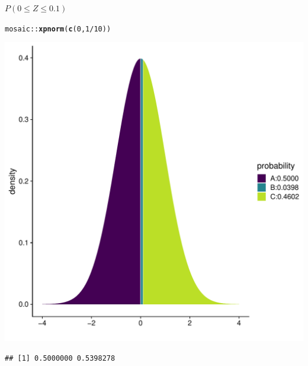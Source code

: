 \documentclass[10pt,handout]{beamer}\usepackage[]{graphicx}\usepackage[]{color}
\makeatletter
\newcommand{\hlnum}[1]{\textcolor[rgb]{0.686,0.059,0.569}{#1}}%
\newcommand{\hlopt}[1]{\textcolor[rgb]{0,0,0}{#1}}%
\newcommand{\hlstd}[1]{\textcolor[rgb]{0.345,0.345,0.345}{#1}}%
\newcommand{\hlkwd}[1]{\textcolor[rgb]{0.737,0.353,0.396}{\textbf{#1}}}%
\newenvironment{kframe}{%
 \def\at@end@of@kframe{}%
 \ifinner\ifhmode%
  \def\at@end@of@kframe{\end{minipage}}%
  \begin{minipage}{\columnwidth}%
 \fi\fi%
 \def\FrameCommand##1{\hskip\@totalleftmargin \hskip-\fboxsep
 \colorbox{shadecolor}{##1}\hskip-\fboxsep
     \hskip-\linewidth \hskip-\@totalleftmargin \hskip\columnwidth}%
 \MakeFramed {\advance\hsize-\width
   \@totalleftmargin\z@ \linewidth\hsize
   \@setminipage}}%
 {\par\unskip\endMakeFramed%
 \at@end@of@kframe}
\newenvironment{knitrout}{}{} %
\makeatother
\begin{document}
\begin{frame}[fragile]{$P(0 \leq Z \leq 0.1)$}

	
\begin{knitrout}\tiny
{}\color{fgcolor}\begin{kframe}
\begin{alltt}
\hlstd{mosaic}\hlopt{::}\hlkwd{xpnorm}\hlstd{(}\hlkwd{c}\hlstd{(}\hlnum{0}\hlstd{,}\hlnum{1}\hlopt{/}\hlnum{10}\hlstd{))}
\end{alltt}
\end{kframe}

{\centering \includegraphics[width=0.60\linewidth]{figure/unnamed-chunk-2-1} 

}


\begin{kframe}\begin{verbatim}
## [1] 0.5000000 0.5398278
\end{verbatim}
\end{kframe}
\end{knitrout}
\end{frame}
\end{document}
